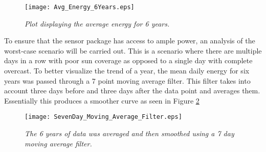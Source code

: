 \begin{figure}[H]
\centering
\texttt{[image: Avg\_Energy\_6Years.eps]}
\caption{\textit{Plot displaying the average energy for 6 years.}}
\label{fig:SOLAR_Avg6}
\end{figure}

\indent To ensure that the sensor package has access to ample power, an analysis of the worst-case scenario will be carried out. This is a scenario where there are multiple days in a row with poor sun coverage as opposed to a single day with complete overcast. To better visualize the trend of a year, the mean daily energy for six years was passed through a 7 point moving average filter. This filter takes into account three days before and three days after the data point and averages them. Essentially this produces a smoother curve as seen in Figure \ref{fig:SOLAR_Move_Avg} \\

\begin{figure}[H]
\centering
\texttt{[image: SevenDay\_Moving\_Average\_Filter.eps]}
\caption{\textit{The 6 years of data was averaged and then smoothed using a 7 day moving average filter.}}
\label{fig:SOLAR_Move_Avg}
\end{figure}